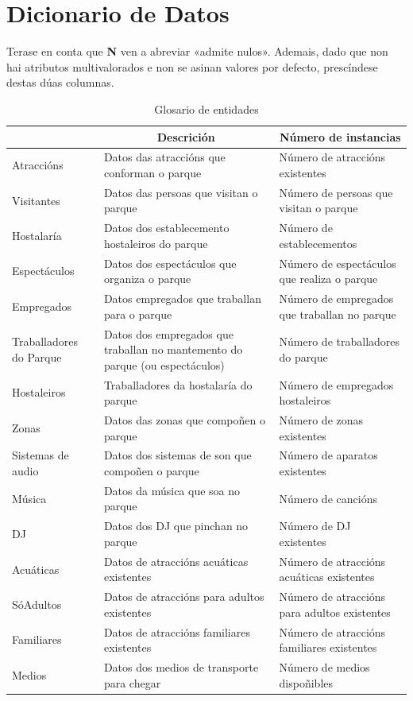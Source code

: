 \documentclass[12pt,a4paper]{book}
\theoremstyle{definition}
\theoremstyle{break}
\begin{document}
\section{Dicionario de Datos}

Terase en conta que \textbf{N} ven a abreviar «admite nulos». Ademais, dado que non hai atributos multivalorados e non se asinan valores por defecto, prescíndese destas dúas columnas.

\begin{table} [H] \centering
	\caption{Glosario de entidades\\}
	\begin{tabular}{|m{2.5cm}|m{5.5cm}|m{5.5cm}|}
	\hline \rowcolor{gris}
	\multicolumn{1}{|c|}{Entidades} & \multicolumn{1}{c|}{Descrición} & \multicolumn{1}{c|}{Número de instancias} \\
	\hline
	Atraccións & Datos das atraccións que conforman o parque & Número de atraccións existentes \\
	\hline
	Visitantes & Datos das persoas que visitan o parque & Número de persoas que visitan o parque \\
	\hline
	Hostalaría & Datos dos establecemento hostaleiros do parque & Número de establecementos \\
	\hline
	Espectáculos & Datos dos espectáculos que organiza o parque & Número de espectáculos que realiza o parque \\
	\hline
	Empregados & Datos empregados que traballan para o parque & Número de empregados que traballan no parque \\
	\hline
	Traballadores do Parque & Datos dos empregados que traballan no mantemento do parque (ou espectáculos) & Número de traballadores do parque \\
	\hline
	Hostaleiros & Traballadores da hostalaría do parque & Número de empregados hostaleiros  \\
	\hline
	Zonas & Datos das zonas que  compoñen o parque & Número de zonas existentes\\
	\hline
	Sistemas de audio &  Datos dos sistemas de son que compoñen o parque & Número de aparatos existentes\\
	\hline
	Música &  Datos da música que soa no parque & Número de cancións\\
	\hline
	DJ &  Datos dos DJ que pinchan no parque & Número de DJ existentes\\
	\hline
	Acuáticas & Datos de atraccións acuáticas existentes & Número de atraccións  acuáticas existentes \\
	\hline
	SóAdultos & Datos de atraccións para adultos existentes & Número de atraccións para adultos existentes \\
	\hline
	Familiares & Datos de atraccións familiares existentes & Número de atraccións  familiares existentes \\
	\hline
	Medios & Datos dos medios de transporte para chegar & Número de medios  dispoñibles \\
	\hline
	\end{tabular}
\end{table}
\end{document}
